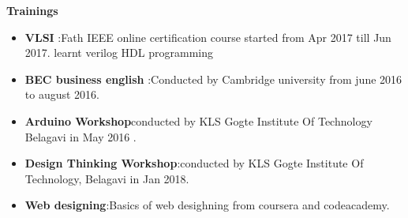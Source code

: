 \documentclass{article}
\begin{document}
\textbf{Trainings}\\[0.1cm]
\begin{itemize}
\item\textbf{ VLSI }:Fath
IEEE online certification course started from  Apr 2017 till Jun 2017.
learnt verilog HDL programming
\item\textbf{BEC business english }:Conducted by Cambridge university from june 2016 to august 2016.
\item\textbf{Arduino Workshop}conducted by KLS Gogte Institute Of Technology Belagavi in 
May 2016 .
\item\textbf{Design Thinking Workshop}:conducted by KLS Gogte Institute Of Technology, Belagavi in Jan 2018.
\item\textbf{Web designing}:Basics of web desighning from coursera and codeacademy. \\
\end{itemize}
\end{document}
